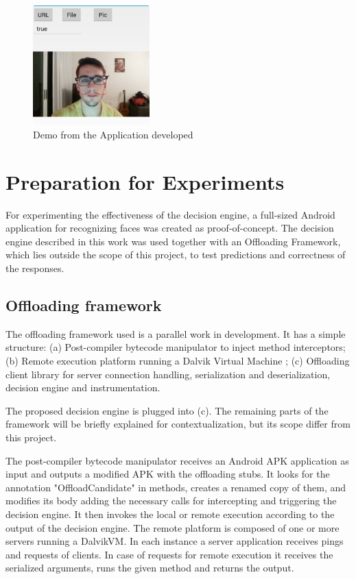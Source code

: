 \documentclass[10pt, conference, letterpaper]{IEEEtran}
\begin{document}
\begin{figure}[!t]
  \centering
  \includegraphics[width=0.4\textwidth]{imgs/app.png}
  \caption{Demo from the Application developed}
  \label{fig:exectime}
\end{figure}

  \section{Preparation for Experiments}
  For experimenting the effectiveness of the decision engine, a full-sized Android application for recognizing faces was created as proof-of-concept. The decision engine described in this work was used together with an Offloading Framework, which lies outside the scope of this project, to test predictions and correctness of the responses.

  \subsection{Offloading framework}
  The offloading framework used is a parallel work in development. It has a simple structure: (a) Post-compiler bytecode manipulator to inject method interceptors; (b) Remote execution platform running a Dalvik Virtual Machine \cite{ehringer2010dalvik}; (c) Offloading client library for server connection handling, serialization and deserialization, decision engine and instrumentation.

  The proposed decision engine is plugged into (c). The remaining parts of the framework will be briefly explained for contextualization, but its scope differ from this project.

  The post-compiler bytecode manipulator receives an Android APK application as input and outputs a modified APK with the offloading stubs. It looks for the annotation "OffloadCandidate" in methods, creates a renamed copy of them, and modifies its body adding the necessary calls for intercepting and triggering the decision engine. It then invokes the local or remote execution according to the output of the decision engine. The remote platform is composed of one or more servers running a DalvikVM. In each instance a server application receives pings and requests of clients. In case of requests for remote execution it receives the serialized arguments, runs the given method and returns the output.
\end{document}
